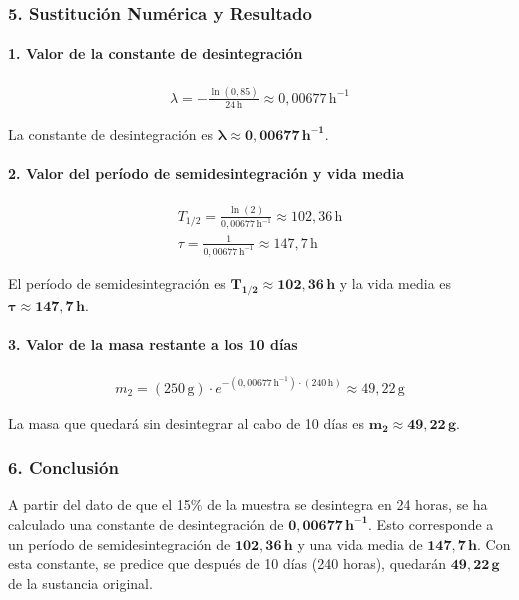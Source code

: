 \subsubsection*{5. Sustitución Numérica y Resultado}
\paragraph*{1. Valor de la constante de desintegración}
\begin{gather}
    \lambda = -\frac{\ln(0,85)}{24 \, \text{h}} \approx 0,00677 \, \text{h}^{-1}
\end{gather}
\begin{cajaresultado}
    La constante de desintegración es $\boldsymbol{\lambda \approx 0,00677 \, h^{-1}}$.
\end{cajaresultado}

\paragraph*{2. Valor del período de semidesintegración y vida media}
\begin{gather}
    T_{1/2} = \frac{\ln(2)}{0,00677 \, \text{h}^{-1}} \approx 102,36 \, \text{h} \\
    \tau = \frac{1}{0,00677 \, \text{h}^{-1}} \approx 147,7 \, \text{h}
\end{gather}
\begin{cajaresultado}
    El período de semidesintegración es $\boldsymbol{T_{1/2} \approx 102,36 \, h}$ y la vida media es $\boldsymbol{\tau \approx 147,7 \, h}$.
\end{cajaresultado}

\paragraph*{3. Valor de la masa restante a los 10 días}
\begin{gather}
    m_2 = (250 \, \text{g}) \cdot e^{-(0,00677 \, \text{h}^{-1}) \cdot (240 \, \text{h})} \approx 49,22 \, \text{g}
\end{gather}
\begin{cajaresultado}
    La masa que quedará sin desintegrar al cabo de 10 días es $\boldsymbol{m_2 \approx 49,22 \, \textbf{g}}$.
\end{cajaresultado}

\subsubsection*{6. Conclusión}
\begin{cajaconclusion}
    A partir del dato de que el 15\% de la muestra se desintegra en 24 horas, se ha calculado una constante de desintegración de $\mathbf{0,00677 \, h^{-1}}$. Esto corresponde a un período de semidesintegración de $\mathbf{102,36 \, h}$ y una vida media de $\mathbf{147,7 \, h}$. Con esta constante, se predice que después de 10 días (240 horas), quedarán $\mathbf{49,22 \, g}$ de la sustancia original.
\end{cajaconclusion}

